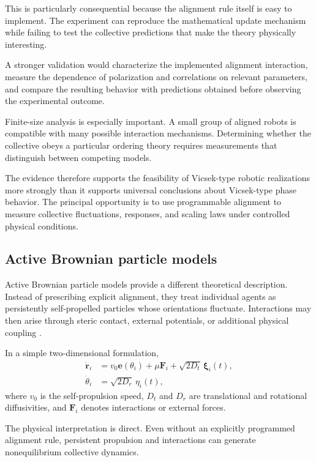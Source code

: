 This is particularly consequential
because the alignment rule itself
is easy to implement. The experiment
can reproduce the mathematical
update mechanism while failing
to test the collective predictions
that make the theory physically
interesting.

A stronger validation would characterize
the implemented alignment interaction,
measure the dependence of polarization
and correlations on relevant parameters,
and compare the resulting behavior
with predictions obtained before
observing the experimental outcome.

Finite-size analysis is especially
important. A small group of aligned
robots is compatible with many
possible interaction mechanisms.
Determining whether the collective
obeys a particular ordering theory
requires measurements that distinguish
between competing models.

The evidence therefore supports
the feasibility of Vicsek-type
robotic realizations more strongly
than it supports universal conclusions
about Vicsek-type phase behavior.
The principal opportunity is to
use programmable alignment to
measure collective fluctuations,
responses, and scaling laws
under controlled physical conditions.

\subsection{Active Brownian particle models}
\label{sec:theory-abp}

Active Brownian particle models provide
a different theoretical description.
Instead of prescribing explicit
alignment, they treat individual
agents as persistently self-propelled
particles whose orientations fluctuate.
Interactions may then arise through
steric contact, external potentials,
or additional physical coupling
\cite{Bechinger2016active}
\cite{Bechinger2016active}.

In a simple two-dimensional formulation,
\begin{align}
\dot{\mathbf r}_i &=
v_0\mathbf e(\theta_i)
+\mu\mathbf F_i
+\sqrt{2D_t}\,\boldsymbol{\xi}_i(t),
\\
\dot{\theta}_i &=
\sqrt{2D_r}\,\eta_i(t),
\label{eq:theory-abp}
\end{align}
where $v_0$ is the self-propulsion speed,
$D_t$ and $D_r$ are translational and
rotational diffusivities, and
$\mathbf F_i$ denotes interactions
or external forces.

The physical interpretation is direct.
Even without an explicitly programmed
alignment rule, persistent propulsion
and interactions can generate
nonequilibrium collective dynamics.


